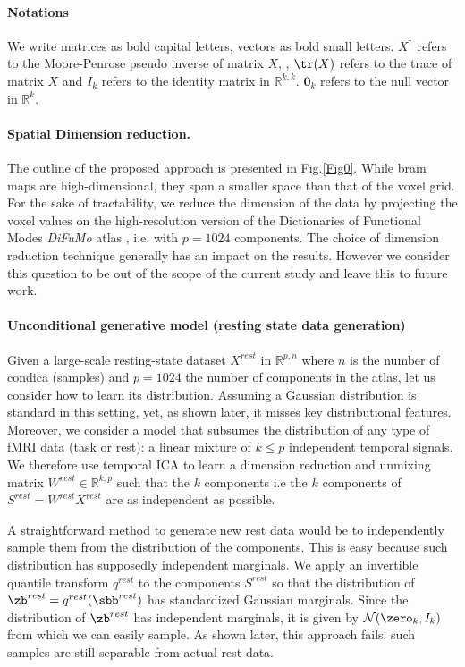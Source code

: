 \paragraph{Notations}
We write matrices as bold capital letters, vectors as bold small letters.
$X^{\dagger}$ refers to the Moore-Penrose pseudo inverse of matrix $X$,
, $\tr(X)$ refers to the trace of matrix $X$ and
$I_k$ refers to the identity matrix in $\mathbb{R}^{k, k}$. $\mathbf{0}_k$ refers to
the null vector in $\mathbb{R}^k$.

\paragraph{Spatial Dimension reduction.} 
The outline of the proposed approach is presented in Fig.\ref{Fig0}.
%
While brain maps are high-dimensional, they span a smaller space than that of
the voxel grid. 
%
For the sake of tractability, we reduce the dimension of the data by projecting the voxel values on the
high-resolution version of the Dictionaries of Functional Modes \emph{DiFuMo}
atlas \cite{dadi_fine-grain_2020}, i.e. with $p=1024$ components.
%
The choice of dimension reduction technique generally has an impact on the
results. However we consider this question to be out of the scope of the current study and leave this to future work.

\paragraph{Unconditional generative model (resting state data generation)}
Given a large-scale resting-state dataset $X^{rest}$ in $\mathbb{R}^{p,n}$ where $n$ is the number of condica (samples) and $p=1024$ the number of components in the atlas, let us consider how to learn its distribution.
%
Assuming a Gaussian distribution is standard in this setting, yet, as
shown later, it misses key distributional features.
%
Moreover, we consider a model that subsumes the distribution of any type of
fMRI data (task or rest): a linear mixture of $k \leq p$ independent temporal signals.
%
We therefore use temporal ICA to learn a dimension reduction and unmixing matrix
$W^{rest} \in \mathbb{R}^{k, p}$ such that the $k$ components i.e the $k$ components of
$S^{rest} = W^{rest} X^{rest}$ are as
independent as possible.
%
 
%

A straightforward method to generate new rest data would be to
independently sample them from the distribution of the components.
%
This is easy because such distribution has supposedly independent marginals.
We apply an invertible quantile transform $q^{rest}$ to the components $S^{rest}$ so that
the distribution of $\zb^{rest} =
q^{rest}(\sbb^{rest})$ has standardized Gaussian marginals. Since the distribution of
$\zb^{rest}$ has independent marginals, it is given by $\mathcal{N}(\zero_k, I_k)$
from which we can easily sample.
As shown later, this approach fails: such samples are still separable
from actual rest data.
%


